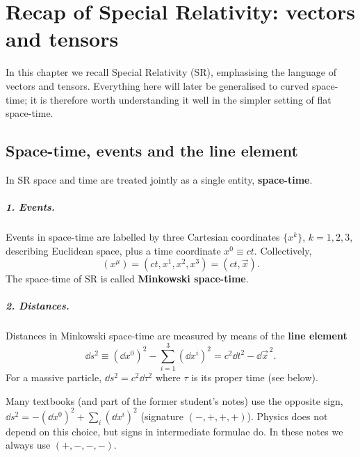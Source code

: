 \chapter{Recap of Special Relativity: vectors and tensors}\label{ch:sr}

In this chapter we recall Special Relativity (SR), emphasising the language of vectors and tensors.
Everything here will later be generalised to curved space-time; it is therefore worth understanding it well in the simpler setting of flat space-time.

\section{Space-time, events and the line element}

In SR space and time are treated jointly as a single entity, \textbf{space-time}.

\paragraph{1. Events.} Events in space-time are labelled by three Cartesian coordinates $\{x^k\}$, $k=1,2,3$, describing Euclidean space, plus a time coordinate $x^0\equiv ct$. Collectively,
\begin{equation}
  (x^\mu) = (ct,x^1,x^2,x^3) = (ct,\vec x).
\end{equation}
The space-time of SR is called \textbf{Minkowski space-time}.

\paragraph{2. Distances.} Distances in Minkowski space-time are measured by means of the \textbf{line element}
\begin{equation}
  \dd s^2 \equiv (\dd x^0)^2-\sum_{i=1}^{3}(\dd x^i)^2 = c^2\dd t^2-\dd\vec x^{\,2} .
  \label{eq:line-element-mink}
\end{equation}
For a massive particle, $\dd s^2=c^2\dd\tau^2$ where $\tau$ is its proper time (see below).
\begin{remarkbox}
Many textbooks (and part of the former student's notes) use the opposite sign, $\dd s^2=-(\dd x^0)^2+\sum_i(\dd x^i)^2$ (signature $(-,+,+,+)$). Physics does not depend on this choice, but signs in intermediate formulae do. In these notes we always use $(+,-,-,-)$.
\end{remarkbox}

